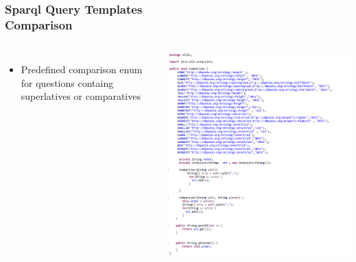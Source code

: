 \documentclass{beamer}
\begin{document}
\begin{frame}
\frametitle{Sparql Query Templates \\ {\small Comparison}}
\begin{columns}[c] %
	
	\begin{itemize}
		\item Predefined comparison enum for questions containg superlatives or comparatives
	\end{itemize}
	
	\includegraphics[scale=0.38]{Comparison.PNG}
	
\end{columns}
\end{frame}
\end{document}
